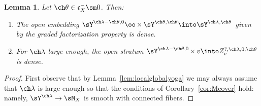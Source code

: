 \documentclass[final]{amsart}
\newtheorem{lem}[subsubsection]{Lemma}
\theoremstyle{remark}
\theoremstyle{definition}
\DeclareMathOperator*{\xt}{\times}
\numberwithin{equation}{section}
\begin{document}
\begin{lem} \label{lem:comp-cover}
Let $\ch\theta\in \mathfrak c_X^- \sm 0$. 
Then:
\begin{enumerate}
\item The open embedding 
$ \sY^{\ch\lambda-\ch\theta,0} \oo\xt \sY^{\ch\theta,\ch\theta} \into
\sY^{\ch\lambda,\ch\theta}$
given by the graded factorization property is dense. 
\item For $\ch\lambda$ large enough, 
the open stratum $\sY^{\ch\lambda-\ch\theta,0} \xt v
\into Z^{?,\ch\lambda,0,\ch\theta}_v$ is dense. 
\end{enumerate}
\end{lem}
\begin{proof}
First observe that by Lemma~\ref{lem:localglobalyoga} we may
always assume that $\ch\lambda$ is large enough so that
the conditions of Corollary~\ref{cor:Mcover} hold: namely, 
$\sY^{\ch\lambda}\to \sM_X$ is smooth with connected fibers. 


\end{proof}
\end{document}
